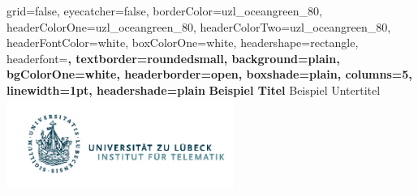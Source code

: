 \documentclass[a0paper,portrait]{baposter}
\begin{document}



\background{
}

\begin{poster}{
	grid=false,
	eyecatcher=false,
	borderColor=uzl_oceangreen_80,
	headerColorOne=uzl_oceangreen_80,
	headerColorTwo=uzl_oceangreen_80,
	headerFontColor=white,
	boxColorOne=white,
	headershape=rectangle,
	headerfont=\large\bf,
	textborder=roundedsmall,
	background=plain,
	bgColorOne=white,
	headerborder=open,
	boxshade=plain,
	columns=5,
	linewidth=1pt,
	headershade=plain
}
{
}
{
	\vspace{0.3cm}
  \textcolor{uzl_oceangreen_80}{\textbf{Beispiel Titel}}
    \vspace{0.3cm}
}
{
  \textcolor{uzl_orange_2}{\textsf{Beispiel Untertitel}}
}
{
  \hspace{1cm}
  \includegraphics[height=8em]{Logo_Inst_Telematik_orig}
}


\end{poster}
\end{document}
